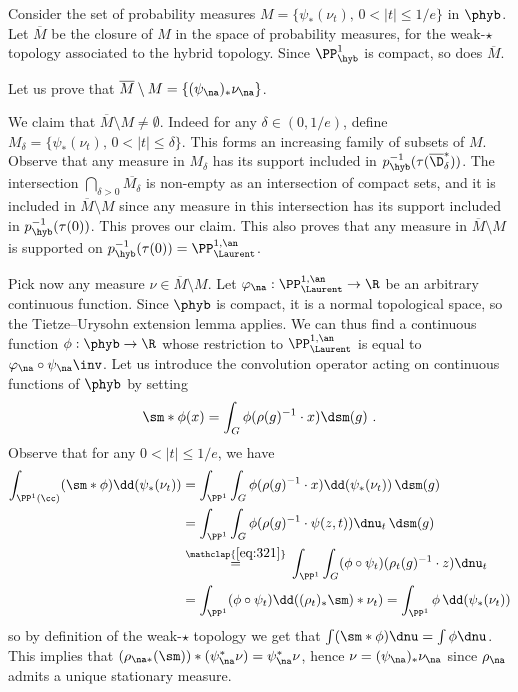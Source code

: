Consider the set of probability measures $M = \{ \psi_*(\nu_t), \, 0 < |t| \le 1/e\}$ in $\phyb$. Let $\overline{M}$ be the closure of $M$ in the space of probability measures, for the weak-$\star$ topology associated to the hybrid topology. Since $\PP^{1}_{\hyb}$ is compact, so does $\overline{M}$.

Let us prove that $\overline{M} \setminus M = \{(\psi_\na)_* \nu_{\na}\}$.

We claim that $\overline{M} \setminus M\neq \emptyset$. Indeed for any $\delta \in (0, 1/e)$, define $M_\delta =\{ \psi_*(\nu_t), \, 0 < |t| \le \delta\}$. This forms an increasing family of subsets of $M$. Observe that any measure in $M_\delta$ has its support included in $p_{\hyb}^{-1}(\tau(\overline{\D}^*_\delta))$. The intersection $\bigcap_{\delta>0} \overline{M_\delta}$ is non-empty as an intersection of compact sets, and it is included in $\overline{M} \setminus M$ since any measure in this intersection has its support included in $p_{\hyb}^{-1}(\tau(0))$. This proves our claim. This also proves that any measure in $\overline{M} \setminus M$ is supported on $p_{\hyb}^{-1}(\tau(0)) = \PP^{1,\an}_{\Laurent}$.

Pick now any measure $\nu \in \overline{M} \setminus M$. Let $\varphi_{\na} : \PP^{1,\an}_{\Laurent} \to \R$ be an arbitrary continuous function. Since $\phyb$ is compact, it is a normal topological space, so the Tietze--Urysohn extension lemma applies. We can thus find a continuous function $\phi: \phyb \to \R$ whose restriction to $\PP^{1,\an}_{\Laurent}$ is equal to $\varphi_{\na}\circ \psi_\na\inv$. Let us introduce the convolution operator acting on continuous functions of $\phyb$ by setting
\[
\sm \ast \phi (x) = \int_G \phi(\rho(g)^{-1} \cdot x) \dsm(g)~.
\]
Observe that for any $0 < |t| \le 1/e$, we have
\begin{align*}
\int_{\PP^1(\cc)} (\sm \ast \phi) \dd(\psi_*(\nu_t)) &=
\int_{\PP^1} \int_G \phi(\rho(g)^{-1} \cdot x) \dd(\psi_*(\nu_t)) \, \dsm(g)
\\ & = \int_{\PP^1} \int_G \phi(\rho(g) ^{-1} \cdot \psi(z,t)) \dnu_t \, \dsm(g)
\\
& \overset{\mathclap{\eqref{eq:321}}}{=}\, \int_{\PP^1} \int_G (\phi \circ \psi_t) (\rho_t(g)^{-1} \cdot z) \dnu_t
\\ &= \int_{\PP^1} (\phi \circ \psi_t) \dd((\rho_t)_*\sm) * \nu_t) = \int_{\PP^1} \phi \, \dd(\psi_{*}(\nu_t))
\end{align*}
so by definition of the weak-$\star$ topology we get that $\int (\sm \ast \phi) \dnu= \int \phi \dnu$. This implies that $(\rho_{\na*}(\sm)) \ast (\psi_\na^*\nu) = \psi_\na^*\nu$, hence $\nu = (\psi_\na)_*\nu_{\na}$ since $\rho_{\na}$ admits a unique stationary measure.

